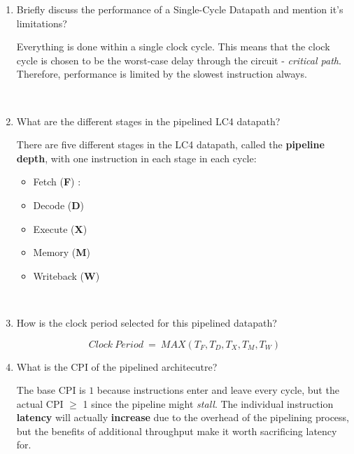 \documentclass[12pt]{article}
\newenvironment{QandA}{\begin{enumerate}[label=\bfseries\arabic*.]\bfseries}
                      {\end{enumerate}}
\newenvironment{answered}{\par\quad\normalfont}{}
\begin{document}
\begin{QandA}
\begin{answered}
    Here $\frac{Instruction}{Program}$ refers to the \textbf{Dynamic Instruction Count}. It is the instructions that the processor will actually run during the course of a program and not just the static instructions (eg: loops).
    \end{answered}
    
    \
    
    \item Briefly discuss the performance of a Single-Cycle Datapath and mention it's limitations?
    \begin{answered}
    Everything is done within a single clock cycle. This means that the clock cycle is chosen to be the worst-case delay through the circuit - \textit{critical path}. Therefore, performance is limited by the slowest instruction always.
    \end{answered}
     
    \ 
        
    \item What are the different stages in the pipelined LC4 datapath?
    \begin{answered}
    There are five different stages in the LC4 datapath, called the \textbf{pipeline depth}, with one instruction in each stage in each cycle:
    \begin{itemize}
        \item Fetch (\textbf{F}) : 
        \item Decode (\textbf{D})
        \item Execute (\textbf{X})
        \item Memory (\textbf{M})
        \item Writeback (\textbf{W})
    \end{itemize}
    \end{answered}
    
    \
    
    \item How is the clock period selected for this pipelined datapath?
    \begin{answered}
    \begin{equation*}
        Clock\ Period\ =\ MAX(T_{F}, T_{D}, T_{X}, T_{M}, T_{W})
    \end{equation*}    
    \end{answered}
    
    \item What is the CPI of the pipelined architecutre?
    \begin{answered}
    The base CPI is $1$ because instructions enter and leave every cycle, but the actual CPI $\geq$ 1 since the pipeline might \textit{stall}. The individual instruction \textbf{latency} will actually \textbf{increase} due to the overhead of the pipelining process, but the benefits of additional throughput make it worth sacrificing latency for.
    \end{answered}
    

\end{QandA}
\end{document}
